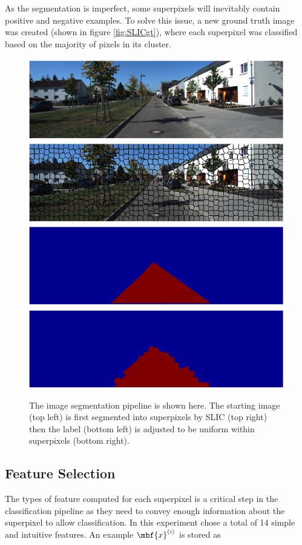 \documentclass{article} %
\begin{document}
As the segmentation is imperfect, some superpixels will inevitably contain positive and negative examples. To solve this issue, a new ground truth image was created (shown in figure \ref{fig:SLICgt}), where each superpixel was classified based on the majority of pixels in its cluster.

\begin{figure}
 \centering
  \includegraphics[width=0.49\linewidth]{figs/noSLICimage.pdf}\hspace{-3pt}
  \includegraphics[width=0.49\linewidth]{figs/SLICimage.pdf}\hspace{-3pt}\\
  \vspace{-2pt}
  \includegraphics[width=0.49\linewidth]{figs/noSLICgt.pdf}\hspace{-3pt}
  \includegraphics[width=0.49\linewidth]{figs/SLICgt.pdf}
  \caption{The image segmentation pipeline is shown here. The starting image (top left) is first segmented into superpixels by SLIC (top right) then the label (bottom left) is adjusted to be uniform within superpixels (bottom right).}
\end{figure}


\subsection{Feature Selection}\label{sec:feat}

The types of feature computed for each superpixel is a critical step in the classification pipeline as they need to convey enough information about the superpixel to allow classification. In this experiment chose a total of 14 simple and intuitive features. An example $\mbf{x}^{(i)}$ is stored as
\end{document}
